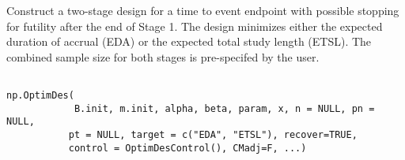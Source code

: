 \begin{Description}\relax
Construct a two-stage design  for a time to event endpoint with possible stopping for futility
after the end of Stage 1.  The design  minimizes either the expected
duration of accrual (EDA) or the expected total study length
(ETSL).  The combined sample size for both stages is
pre-specifed by the user.
\end{Description}
\begin{Usage}
\begin{verbatim}

np.OptimDes(
            B.init, m.init, alpha, beta, param, x, n = NULL, pn = NULL,
           pt = NULL, target = c("EDA", "ETSL"), recover=TRUE,
           control = OptimDesControl(), CMadj=F, ...)
\end{verbatim}
\end{Usage}
